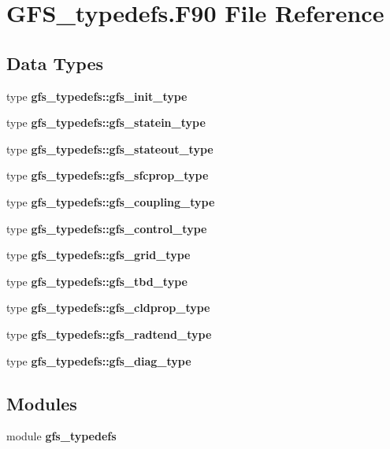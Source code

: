 \section{G\+F\+S\+\_\+typedefs.\+F90 File Reference}
\label{_g_f_s__typedefs_8_f90}
\subsection*{Data Types}
\begin{DoxyCompactItemize}
\item 
type \textbf{ gfs\+\_\+typedefs\+::gfs\+\_\+init\+\_\+type}
\item 
type \textbf{ gfs\+\_\+typedefs\+::gfs\+\_\+statein\+\_\+type}
\item 
type \textbf{ gfs\+\_\+typedefs\+::gfs\+\_\+stateout\+\_\+type}
\item 
type \textbf{ gfs\+\_\+typedefs\+::gfs\+\_\+sfcprop\+\_\+type}
\item 
type \textbf{ gfs\+\_\+typedefs\+::gfs\+\_\+coupling\+\_\+type}
\item 
type \textbf{ gfs\+\_\+typedefs\+::gfs\+\_\+control\+\_\+type}
\item 
type \textbf{ gfs\+\_\+typedefs\+::gfs\+\_\+grid\+\_\+type}
\item 
type \textbf{ gfs\+\_\+typedefs\+::gfs\+\_\+tbd\+\_\+type}
\item 
type \textbf{ gfs\+\_\+typedefs\+::gfs\+\_\+cldprop\+\_\+type}
\item 
type \textbf{ gfs\+\_\+typedefs\+::gfs\+\_\+radtend\+\_\+type}
\item 
type \textbf{ gfs\+\_\+typedefs\+::gfs\+\_\+diag\+\_\+type}
\end{DoxyCompactItemize}
\subsection*{Modules}
\begin{DoxyCompactItemize}
\item 
module \textbf{ gfs\+\_\+typedefs}
\end{DoxyCompactItemize}

